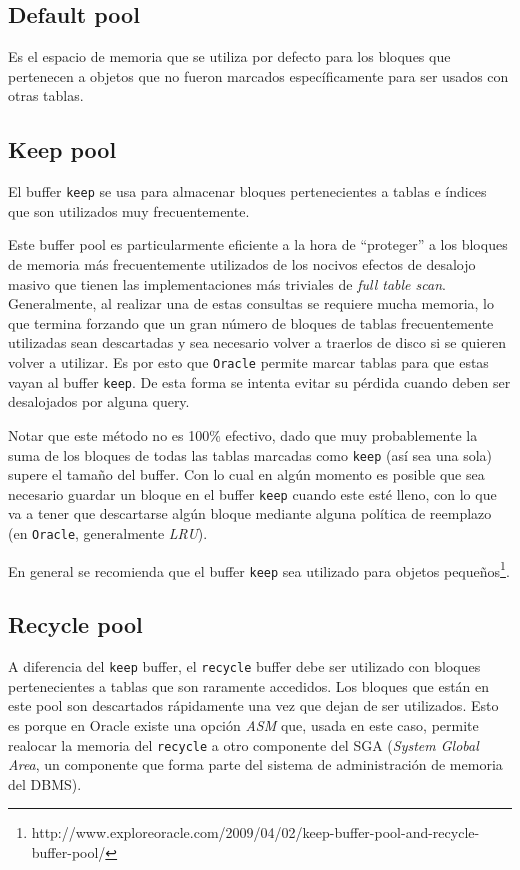 \subsection{Default pool}
Es el espacio de memoria que se utiliza por defecto para los bloques que pertenecen a objetos que no fueron marcados específicamente para ser usados con otras tablas.

\subsection{Keep pool}
El buffer \texttt{keep} se usa para almacenar bloques pertenecientes a tablas e índices que son utilizados muy frecuentemente. 

Este buffer pool es particularmente eficiente a la hora de ``proteger'' a los bloques de memoria más frecuentemente utilizados de los nocivos efectos de desalojo masivo que tienen las implementaciones más triviales de \textit{full table scan}. Generalmente, al realizar una de estas consultas se requiere mucha memoria, lo que termina forzando que un gran número de bloques de tablas frecuentemente utilizadas sean descartadas y sea necesario volver a traerlos de disco si se quieren volver a utilizar. Es por esto que \texttt{Oracle} permite marcar tablas para que estas vayan al buffer \texttt{keep}. De esta forma se intenta evitar su pérdida cuando deben ser desalojados por alguna query.

Notar que este método no es 100\% efectivo, dado que muy probablemente la suma de los bloques de todas las tablas marcadas como \texttt{keep} (así sea una sola) supere el tamaño del buffer. Con lo cual en algún momento es posible que sea necesario guardar un bloque en el buffer \texttt{keep} cuando este esté lleno, con lo que va a tener que descartarse algún bloque mediante alguna política de reemplazo (en \texttt{Oracle}, generalmente \textit{LRU}). 

En general se recomienda que el buffer \texttt{keep} sea utilizado para objetos pequeños\footnote{http://www.exploreoracle.com/2009/04/02/keep-buffer-pool-and-recycle-buffer-pool/}.

\subsection{Recycle pool}
A diferencia del \texttt{keep} buffer, el \texttt{recycle} buffer debe ser utilizado con bloques pertenecientes a tablas que son raramente accedidos. Los bloques que están en este pool son descartados rápidamente una vez que dejan de ser utilizados\footnotemark[\value{footnote}]. Esto es porque en Oracle existe una opción \textit{ASM} que, usada en este caso, permite realocar la memoria del \texttt{recycle} a otro componente del SGA (\textit{System Global Area}, un componente que forma parte del sistema de administración de memoria del DBMS).

